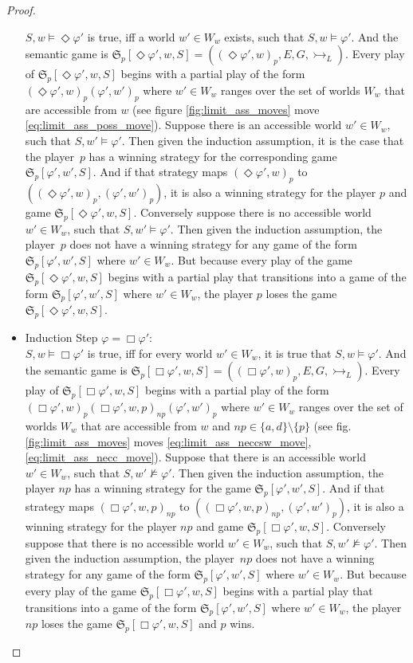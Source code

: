 \documentclass[a4paper,american]{paper}
\theoremstyle{definition}\newtheorem{definition}{Definition}
\begin{document}
\begin{proof}
\begin{itemize}
$S,w\vDash\Diamond\varphi'$ is true, iff a world $w'\in W_w$ exists, such that $S,w\vDash\varphi'$. And the semantic game is $\mathfrak{S}_p[\Diamond\varphi',w,S]=((\Diamond\varphi' ,w)_p, E, G, \rightarrowtail_L)$. Every play of $\mathfrak{S}_p[\Diamond\varphi',w,S]$ begins with a partial play of the form $(\Diamond\varphi' ,w)_p(\varphi' ,w')_p$ where $w'\in W_w$ ranges over the set of worlds $W_w$ that are accessible from $w$ (see figure \ref{fig:limit_ass_moves} move \ref{eq:limit_ass_poss_move}). Suppose there is an accessible world $w'\in W_w$, such that $S,w'\vDash\varphi'$. Then given the induction assumption, it is the case that the player~$p$ has a winning strategy for the corresponding game $\mathfrak{S}_{p}[\varphi' ,w',S]$. And if that strategy maps $(\Diamond\varphi' ,w)_p$ to $((\Diamond\varphi' ,w)_p,(\varphi' ,w')_p)$, it is also a winning strategy for the player $p$ and game $\mathfrak{S}_p[\Diamond\varphi',w,S]$. Conversely suppose there is no accessible world $w'\in W_w$, such that $S,w'\vDash\varphi'$. Then given the induction assumption, the player~$p$ does not have a winning strategy for any game of the form $\mathfrak{S}_{p}[\varphi' ,w',S]$ where $w'\in W_w$. But because every play of the game $\mathfrak{S}_p[\Diamond\varphi',w,S]$ begins with a partial play that transitions into a game of the form $\mathfrak{S}_{p}[\varphi' ,w',S]$ where $w'\in W_w$, the player $p$ loses the game $\mathfrak{S}_p[\Diamond\varphi',w,S]$.

\item Induction Step $\varphi=\Box\varphi'$:\\
$S,w\vDash\Box\varphi'$ is true, iff for every world $w'\in W_w$, it is true that $S,w\vDash\varphi'$. And the semantic game is $\mathfrak{S}_p[\Box\varphi',w,S]=((\Box\varphi' ,w)_p, E, G, \rightarrowtail_L)$. Every play of $\mathfrak{S}_p[\Box\varphi',w,S]$ begins with a partial play of the form $(\Box\varphi' ,w)_p(\Box\varphi' ,w,p)_{np}(\varphi' ,w')_p$ where $w'\in W_w$ ranges over the set of worlds $W_w$ that are accessible from $w$ and $np\in\{a,d\}\setminus{}\{p\}$ (see fig. \ref{fig:limit_ass_moves} moves \ref{eq:limit_ass_neccsw_move},\ref{eq:limit_ass_necc_move}). Suppose that there is an accessible world $w'\in W_w$, such that $S,w'\nvDash\varphi'$. Then given the induction assumption, the player $np$ has a winning strategy for the game $\mathfrak{S}_p[\varphi',w',S]$. And if that strategy maps $(\Box\varphi' ,w,p)_{np}$ to $((\Box\varphi' ,w,p)_{np},(\varphi' ,w')_p)$, it is also a winning strategy for the player $np$ and game $\mathfrak{S}_p[\Box\varphi',w,S]$. Conversely suppose that there is no accessible world $w'\in W_w$, such that $S,w'\nvDash\varphi'$. Then given the induction assumption, the player~$np$ does not have a winning strategy for any game of the form $\mathfrak{S}_{p}[\varphi' ,w',S]$ where $w'\in W_w$. But because every play of the game $\mathfrak{S}_p[\Box\varphi',w,S]$ begins with a partial play that transitions into a game of the form $\mathfrak{S}_{p}[\varphi' ,w',S]$ where $w'\in W_w$, the player $np$ loses the game $\mathfrak{S}_p[\Box\varphi',w,S]$ and $p$ wins.


\end{itemize}
\end{proof}
\end{document}
